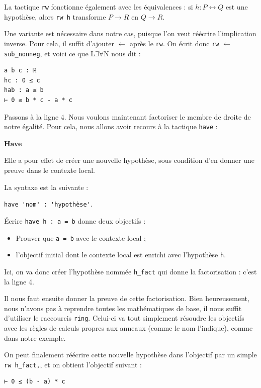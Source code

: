 \documentclass[a4paper, 11pt, twoside]{report}
\newcommand{\LEAN}{L$\exists\forall$N }
\begin{document}
La tactique \verb|rw| fonctionne également avec les équivalences : si $h : P \leftrightarrow Q$ est une hypothèse, alors \verb|rw h| transforme $P \rightarrow R$ en $Q \rightarrow R$.

Une variante est nécessaire dans notre cas, puisque l'on veut réécrire l'implication inverse. Pour cela, il suffit d'ajouter $\leftarrow$ après le \verb|rw|. On écrit donc \verb|rw| $\leftarrow$ \verb|sub_nonneg|, et voici ce que \LEAN nous dit :
\begin{lstlisting}
a b c : ℝ
hc : 0 ≤ c
hab : a ≤ b
⊢ 0 ≤ b * c - a * c
\end{lstlisting}

Passons à la ligne 4. Nous voulons maintenant factoriser le membre de droite de notre égalité. Pour cela, nous allons avoir recours à la tactique \verb|have| :

\begin{tactic}
	\centerline{\bfseries Have}
	Elle a pour effet de créer une nouvelle hypothèse, sous condition d'en donner une preuve dans le contexte local.
	
	La syntaxe est la suivante :
	
	\verb|have 'nom' : 'hypothèse'|.
	
	\tcblower
	
	Écrire \verb|have h : a = b| donne deux objectifs :
	\begin{itemize}
		\item Prouver que \verb|a = b| avec le contexte local ;
		\item l'objectif initial dont le contexte local est enrichi avec l'hypothèse \verb|h|.
	\end{itemize}
\end{tactic}

Ici, on va donc créer l'hypothèse nommée \verb|h_fact| qui donne la factorisation : c'est la ligne 4.

Il nous faut ensuite donner la preuve de cette factorisation. Bien heureusement, nous n'avons pas à reprendre toutes les mathématiques de base, il nous suffit d'utiliser le raccourcis \verb|ring|. Celui-ci va tout simplement résoudre les objectifs avec les règles de calculs propres aux anneaux (comme le nom l'indique), comme dans notre exemple. 

On peut finalement réécrire cette nouvelle hypothèse dans l'objectif par un simple \verb|rw h_fact,|, et on obtient l'objectif suivant :

\begin{lstlisting}
⊢ 0 ≤ (b - a) * c
\end{lstlisting}
\end{document}
